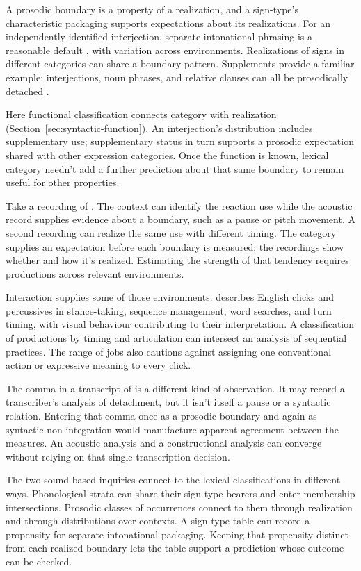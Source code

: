 \documentclass[12pt]{article}
\begin{document}
A prosodic boundary is a property of a realization, and a sign-type's
characteristic packaging supports expectations about its realizations.
For an independently identified interjection, separate intonational
phrasing is a reasonable default \citep[108]{ameka1992}, with
variation across environments. Realizations of
signs in different categories can share a boundary pattern. Supplements
provide a familiar example: interjections, noun phrases, and relative
clauses can all be prosodically detached
\citep[66, 1350]{HuddlestonPullum2002}.

Here functional classification connects category with realization
(Section~\ref{sec:syntactic-function}). An interjection's distribution
includes supplementary use; supplementary status in turn supports a
prosodic expectation shared with other expression categories. Once the
function is known, lexical category needn't add a further prediction
about that same boundary to remain useful for other properties.

Take a recording of . The
context can identify the reaction use while the acoustic record supplies
evidence about a boundary, such as a pause or pitch movement. A
second recording can realize the same use with different timing.
The category supplies an expectation before each boundary is measured;
the recordings show whether and how it's realized. Estimating the
strength of that tendency requires productions across relevant environments.

Interaction supplies some of those environments. \textcite{ogden2013clicks} describes English
clicks and percussives in stance-taking, sequence management, word searches,
and turn timing, with visual behaviour contributing to their interpretation. A classification of productions by timing and
articulation can intersect an analysis of sequential practices.
The range of jobs also cautions against assigning one conventional action
or expressive meaning to every click.

The comma in a transcript of 
is a different kind of observation. It may record a transcriber's
analysis of detachment, but it isn't itself a pause or a syntactic
relation. Entering that comma once as a prosodic boundary and again
as syntactic non-integration would manufacture apparent agreement between
the measures. An acoustic analysis and a constructional analysis can
converge without relying on that single transcription decision.

The two sound-based inquiries connect to the lexical classifications in
different ways. Phonological strata can share their sign-type bearers and
enter membership intersections. Prosodic classes of occurrences connect
to them through realization and through distributions over contexts.
A sign-type table can record a propensity for separate intonational
packaging. Keeping that propensity distinct from each realized boundary
lets the table support a prediction whose outcome can be checked.
\end{document}
